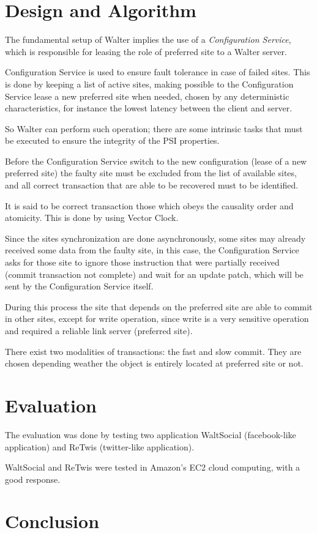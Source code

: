\documentclass[a4paper]{article}
\begin{document}

\section{Design and Algorithm}

The fundamental setup of Walter implies the use of a \textit{Configuration Service}, which is responsible for leasing the role of preferred site to a Walter server. 

Configuration Service is used to ensure fault tolerance in case of failed sites. This is done by keeping a list of active sites, making possible to the Configuration Service lease a new preferred site when needed, chosen by any deterministic characteristics, for instance the lowest latency between the client and server. 

So Walter can perform such operation; there are some intrinsic tasks that must be executed to ensure the integrity of the PSI properties.

Before the Configuration Service switch to the new configuration (lease of a new preferred site) the faulty site must be excluded from the list of available sites, and all correct transaction that are able to be recovered must to be identified.

It is said to be correct transaction those which obeys the causality order and atomicity. This is done by using Vector Clock. 

Since the sites synchronization are done asynchronously, some sites may already received some data from the faulty site, in this case, the Configuration Service asks for those site to ignore those instruction that were partially received (commit transaction not complete) and wait for an update patch, which will be sent by the Configuration Service itself.

During this process the site that depends on the preferred site are able to commit in other sites, except for write operation, since write is a very sensitive operation and required a reliable link server (preferred site).

There exist two modalities of transactions: the fast and slow commit. They are chosen depending weather the object is entirely located at preferred site  or not.


\section{Evaluation}

The evaluation was done by testing two application WaltSocial (facebook-like application) and ReTwis (twitter-like application).

WaltSocial and ReTwis were tested in Amazon's EC2 cloud computing, with a good response.




\section{Conclusion}
\end{document}
